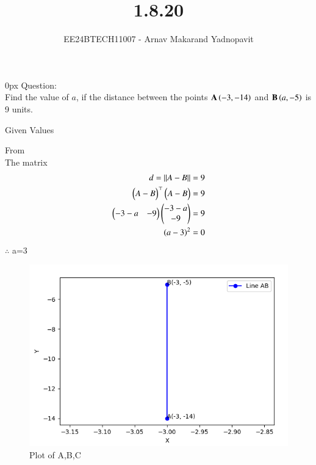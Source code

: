 \documentclass[journal]{IEEEtran}
\begin{document}

\title{1.8.20}
\author{EE24BTECH11007 - Arnav Makarand Yadnopavit}
{\let\newpage\relax\maketitle}
\renewcommand{\thefigure}{\theenumi}
\renewcommand{\thetable}{\theenumi}
\setlength{\intextsep}{10pt} %
\renewcommand{\thetable}{\theenumi}
\parindent 0px
Question:\\
Find the value of $a$, if the distance between the points $\mathbf{A}\left(-3,-14\right)$ and $\mathbf{B}\left(a,-5\right)$ is 9 units.\\
\solution
\begin{table}[h]
    \centering
    
    \caption{Given Values}
    \label{tab:1}
\end{table}
From \\
The matrix
\begin{align}
d = \left\lVert A-B\right\rVert=9\\
\begin{pmatrix}A-B\end{pmatrix}^\top\begin{pmatrix}A-B\end{pmatrix}=9\\
\begin{pmatrix}-3-a & -9\end{pmatrix}\begin{pmatrix}-3-a \\ -9\end{pmatrix}=9\\
\left(a-3\right)^2=0
\end{align}
$\therefore$ a=3
\begin{figure}[h]
    \centering
    \includegraphics[width=\columnwidth]{figs/fig.png}
    \caption{Plot of A,B,C}
 \end{figure}
\end{document}
